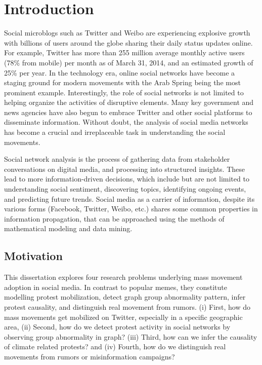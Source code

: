 \chapter{Introduction}
Social microblogs such as Twitter and Weibo are experiencing explosive growth with billions of users around the globe sharing their daily status updates online. For example, Twitter has more than 255 million average monthly active users (78\% from mobile) per month as of March 31, 2014, and an estimated growth of 25\% per year. In the technology era, online social networks have become a staging ground for modern movements with the Arab Spring being the most prominent example. Interestingly, the role of social networks is not limited to helping organize the activities of disruptive elements. Many key government and news agencies have also begun to embrace Twitter and other social platforms to disseminate information. Without doubt, the analysis of social media networks has become a crucial and irreplaceable task in understanding the social movements.

Social network analysis is the process of gathering data from stakeholder conversations on digital media, and processing into structured insights. These lead to more information-driven decisions, which include but are not limited to understanding social sentiment, discovering topics, identifying ongoing events, and predicting future trends. Social media as a carrier of information, despite its various forms (Facebook, Twitter, Weibo, etc.)
shares some common properties in information propagation, that can be approached
using the methods of mathematical modeling and data mining.


\section{Motivation}
 This dissertation explores four research problems underlying mass movement adoption in social media. In contrast to popular memes, they constitute modelling protest mobilization, detect graph group abnormality pattern, infer protest causality, and distinguish real movement from rumors. 
(i) First, how do mass movements get mobilized on Twitter, especially in a specific geographic area,
(ii) Second, how do we detect protest activity in social networks by observing group abnormality in graph?
(iii) Third, how can we infer the causality of climate related protests?
and (iv) Fourth, how do we distinguish real movements from rumors or misinformation campaigns?
\\

